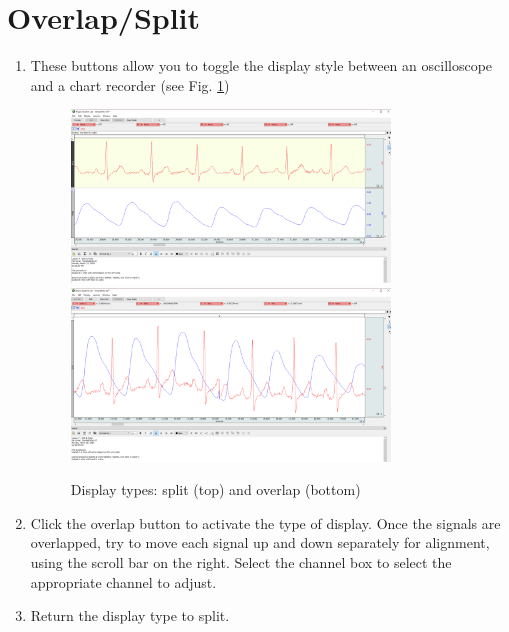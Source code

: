 \documentclass{article}
\begin{document}
\section*{Overlap/Split}
\begin{enumerate}
	\item These buttons allow you to toggle the display style between an oscilloscope and a chart recorder (see Fig. \ref{overlap_split})
	
		\begin{figure}[h]
		\includegraphics[width=0.8\textwidth]{../images/BIOPAC_23.png}
		\includegraphics[width=0.8\textwidth]{../images/BIOPAC_24.png}
		\centering
		\caption{Display types: split (top) and overlap (bottom)}
		\label{overlap_split}
		\end{figure}
	
	\item Click the overlap button to activate the type of display. Once the signals are overlapped, try to move each signal up and down separately for alignment, using the scroll bar on the right. Select the channel box to select the appropriate channel to adjust.
	\item Return the display type to split.
\end{enumerate}
\end{document}
